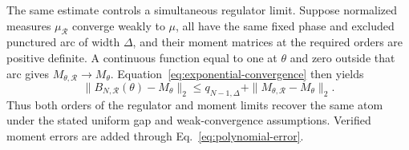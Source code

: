 The same estimate controls a simultaneous regulator limit. Suppose normalized measures $\mu_{\mathcal R}$ converge weakly to $\mu$, all have the same fixed phase and excluded punctured arc of width $\Delta$, and their moment matrices at the required orders are positive definite. A continuous function equal to one at $\theta$ and zero outside that arc gives $M_{\theta,\mathcal R}\to M_\theta$. Equation~\eqref{eq:exponential-convergence} then yields
\[
\|B_{N,\mathcal R}(\theta)-M_\theta\|_2
\leq q_{N-1,\Delta}+\|M_{\theta,\mathcal R}-M_\theta\|_2.
\]
Thus both orders of the regulator and moment limits recover the same atom under the stated uniform gap and weak-convergence assumptions. Verified moment errors are added through Eq.~\eqref{eq:polynomial-error}.
